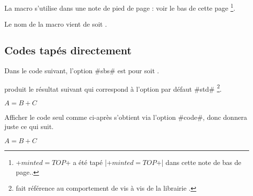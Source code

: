\begin{bdocimportant}
    La macro  s'utilise dans une note de pied de page : voir le bas de cette page
    \footnote{
        \bdocinlatex+$minted = TOP$+ a été tapé \bdocinlatex|\bdocinlatex+$minted = TOP$+| dans cette note de bas de page..
    }.
\end{bdocimportant}


\begin{bdocrem}
    Le nom de la macro  vient de  soit .
\end{bdocrem}




\subsection{Codes tapés directement}

\begin{bdocexa}
    Dans le code suivant, l'option \bdocinlatex#sbs# est pour  soit .

\end{bdocexa}




\begin{bdocexa}[À la suite]
     produit le résultat suivant qui correspond à l'option par défaut \bdocinlatex#std#
    \footnote{
         fait référence au comportement  de  vis à vis de la librairie .
    }.

    \begin{bdoclatex}
        $A = B + C$
    \end{bdoclatex}
\end{bdocexa}




\begin{bdocexa}
    Afficher le code seul comme ci-après s'obtient via l'option \bdocinlatex#code#, donc  donnera juste ce qui suit.

    \begin{bdoclatex}[code]
        $A = B + C$
    \end{bdoclatex}
\end{bdocexa}


